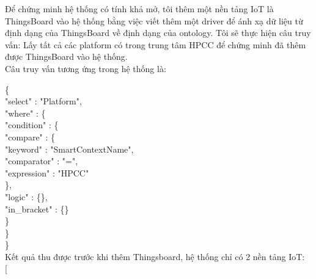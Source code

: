 Để chứng minh hệ thống có tính khả mở, tôi thêm một nền tảng IoT là ThingsBoard vào hệ thống bằng việc viết thêm một driver để ánh xạ dữ liệu từ định dạng của ThingsBoard về định dạng của ontology. Tôi sẽ thực hiện câu truy vấn: Lấy tất cả các platform có trong trung tâm HPCC để chứng minh đã thêm được ThingsBoard vào hệ thống. \\

Câu truy vấn tương ứng trong hệ thống là:

\{\\
\blank{1cm}"select" : "Platform",\\
\blank{1cm}"where" : \{\\
\blank{2cm}"condition" : \{\\
\blank{3cm}"compare" : \{\\
\blank{4cm}    "keyword" : "SmartContextName",\\
\blank{4cm}    "comparator" : "=",\\
\blank{4cm}    "expression" : "HPCC"\\
\blank{3cm}\},\\
\blank{3cm}"logic" : \{\},\\
\blank{3cm}"in\_bracket" : \{\}\\
\blank{2cm}\}\\
\blank{1cm}\}\\
\}\\

Kết quả thu được trước khi thêm Thingsboard, hệ thống chỉ có 2 nền tảng IoT: \\

[\\

